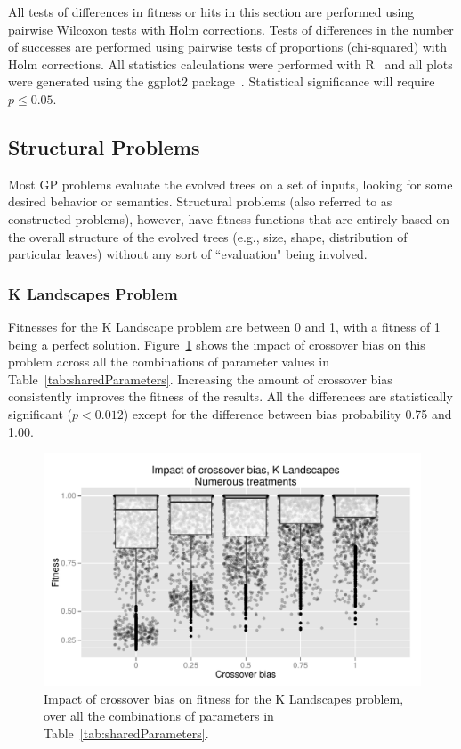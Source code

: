 \documentclass{sig-alternate}
\begin{document}
All tests of differences in fitness or hits in this section are performed using pairwise Wilcoxon tests with Holm
corrections. Tests of differences in the number of successes are performed using pairwise tests of proportions
(chi-squared) with Holm corrections. All statistics calculations were performed with R~\cite{R} and all plots were
generated using the ggplot2 package~\cite{ggplot2Book}. Statistical significance will require $p \leq 0.05$.

\subsection{Structural Problems}

Most GP problems evaluate the evolved trees on a set of inputs, looking for some desired behavior or semantics.
Structural problems (also referred to as constructed problems), however, have fitness functions that are entirely 
based on the overall structure of the evolved trees (e.g., size, shape, distribution of particular leaves) without 
any sort of ``evaluation" being involved.

\subsubsection{K Landscapes Problem}

Fitnesses for the K Landscape problem are between 0 and 1, with a fitness of 1 being a perfect solution.
Figure~\ref{fig:KLandscapes6_results} shows the impact of crossover bias on this problem across all the combinations of
parameter values in Table~\ref{tab:sharedParameters}. Increasing the amount of crossover bias consistently improves the
fitness of the results. All the differences are statistically significant ($p < 0.012$) except for the difference
between bias probability 0.75 and 1.00.

%
%
%
%

\begin{figure}[t]
\centering
\includegraphics[width=0.45 \textwidth]{Plots/KLandscapes6_XO_bias_impact_transformed_boxplot_alpha075.pdf}
\caption{Impact of crossover bias on fitness for the K Landscapes problem, over all the combinations of 
	parameters in Table~\ref{tab:sharedParameters}.}
\label{fig:KLandscapes6_results}
\end{figure}
\end{document}
